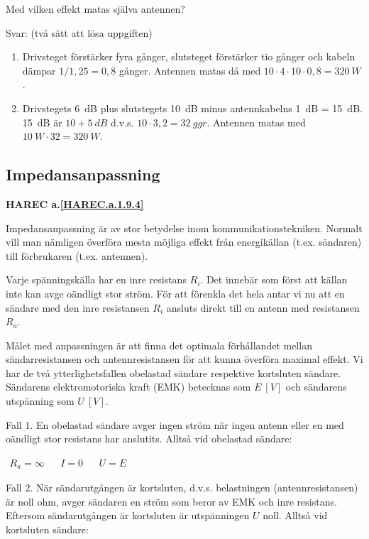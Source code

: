 Med vilken effekt matas själva antennen?

Svar: (två sätt att lösa uppgiften)
\begin{enumerate}
\item Drivsteget förstärker fyra gånger, slutsteget förstärker tio gånger och
kabeln dämpar \(1/1,25 = 0,8\) gånger. Antennen matas då med
\(10 \cdot 4 \cdot 10 \cdot 0,8 = 320\ W\).
\item Drivstegets 6~dB plus slutstegets 10~dB minus antennkabelns 1~dB = 15~dB.
15~dB är \(10 + 5\ dB\) d.v.s. \(10 \cdot 3,2 = 32\ ggr\). Antennen matas med
\(10\ W \cdot 32 = 320\ W\).
\end{enumerate}

\subsection{Impedansanpassning}
\textbf{HAREC a.\ref{HAREC.a.1.9.4}\label{myHAREC.a.1.9.4}}

Impedansanpassning är av stor betydelse inom kommunikationstekniken.
Normalt vill man nämligen överföra mesta möjliga effekt från energikällan
(t.ex. sändaren) till förbrukaren (t.ex. antennen).

Varje spänningskälla har en inre resistans \(R_i\). Det innebär som först att
källan inte kan avge oändligt stor ström. För att förenkla det hela antar vi nu
att en sändare med den inre resistansen \(R_i\) ansluts direkt till en antenn
med resistansen \(R_a\).

Målet med anpassningen är att finna det optimala förhållandet mellan
sändarresistansen och antennresistansen för att kunna överföra maximal effekt.
Vi har de två ytterlighetsfallen obelastad sändare respektive kortsluten
sändare. Sändarens elektromotoriska kraft (EMK) betecknas som \(E\ [V]\) och
sändarens utspänning som \(U\ [V]\).

Fall 1.
En obelastad sändare avger ingen ström när ingen antenn eller en med oändligt
stor resistans har anslutits.
Alltså vid obelastad sändare:

\(
\begin{array}{lllll}
R_a = \infty & & I = 0 & & U = E
\end{array}
\)

Fall 2.
När sändarutgången är kortsluten, d.v.s. belastningen (antennresistansen) är
noll ohm, avger sändaren en ström som beror av EMK och inre resistans. Eftersom
sändarutgången är kortsluten är utspänningen \(U\) noll.
Alltså vid kortsluten sändare:

